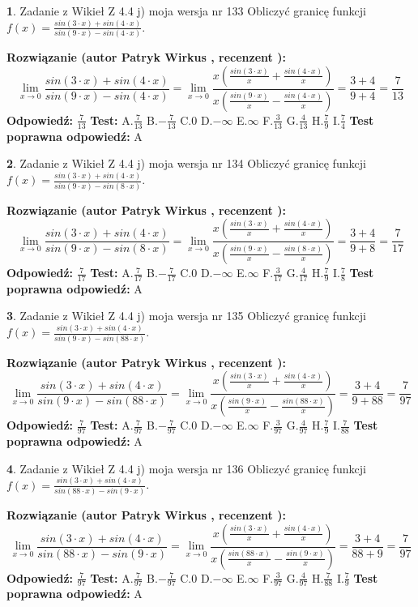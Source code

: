 \documentclass[12pt, a4paper]{article}
\theoremstyle{definition} %
\newtheorem{zad}{}
\newcommand{\zadStart}[1]{\begin{zad}#1\newline}
\newcommand{\zadStop}{\end{zad}}
\newcommand{\rozwStart}[2]{\noindent \textbf{Rozwiązanie (autor #1 , recenzent #2): }\newline}
\newcommand{\rozwStop}{\newline}
\newcommand{\odpStart}{\noindent \textbf{Odpowiedź:}\newline}
\newcommand{\odpStop}{\newline}
\newcommand{\testStart}{\noindent \textbf{Test:}\newline}
\newcommand{\testStop}{\newline}
\newcommand{\kluczStart}{\noindent \textbf{Test poprawna odpowiedź:}\newline}
\newcommand{\kluczStop}{\newline}
\begin{document}
\zadStart{Zadanie z Wikieł Z 4.4 j) moja wersja nr 133}
Obliczyć granicę funkcji $f(x)=\frac{sin(3\cdot x) +sin(4\cdot x)}{sin(9\cdot x) -sin(4\cdot x)}$.
\zadStop
\rozwStart{Patryk Wirkus}{}
$$\lim\limits_{x\to 0}\frac{sin(3\cdot x) +sin(4\cdot x)}{sin(9\cdot x) -sin(4\cdot x)}=\lim\limits_{x\to 0}\frac{x(\frac{sin(3\cdot x)}{x}+\frac{sin(4\cdot x)}{x})}{x(\frac{sin(9\cdot x)}{x}-\frac{sin(4\cdot x)}{x})}=\frac{3+4}{9+4} = \frac{7}{13}$$
\rozwStop
\odpStart
$\frac{7}{13}$
\odpStop
\testStart
A.$\frac{7}{13}$
B.$-\frac{7}{13}$
C.$0$
D.$-\infty$
E.$\infty$
F.$\frac{3}{13}$
G.$\frac{4}{13}$
H.$\frac{7}{9}$
I.$\frac{7}{4}$
\testStop
\kluczStart
A
\kluczStop



\zadStart{Zadanie z Wikieł Z 4.4 j) moja wersja nr 134}
Obliczyć granicę funkcji $f(x)=\frac{sin(3\cdot x) +sin(4\cdot x)}{sin(9\cdot x) -sin(8\cdot x)}$.
\zadStop
\rozwStart{Patryk Wirkus}{}
$$\lim\limits_{x\to 0}\frac{sin(3\cdot x) +sin(4\cdot x)}{sin(9\cdot x) -sin(8\cdot x)}=\lim\limits_{x\to 0}\frac{x(\frac{sin(3\cdot x)}{x}+\frac{sin(4\cdot x)}{x})}{x(\frac{sin(9\cdot x)}{x}-\frac{sin(8\cdot x)}{x})}=\frac{3+4}{9+8} = \frac{7}{17}$$
\rozwStop
\odpStart
$\frac{7}{17}$
\odpStop
\testStart
A.$\frac{7}{17}$
B.$-\frac{7}{17}$
C.$0$
D.$-\infty$
E.$\infty$
F.$\frac{3}{17}$
G.$\frac{4}{17}$
H.$\frac{7}{9}$
I.$\frac{7}{8}$
\testStop
\kluczStart
A
\kluczStop



\zadStart{Zadanie z Wikieł Z 4.4 j) moja wersja nr 135}
Obliczyć granicę funkcji $f(x)=\frac{sin(3\cdot x) +sin(4\cdot x)}{sin(9\cdot x) -sin(88\cdot x)}$.
\zadStop
\rozwStart{Patryk Wirkus}{}
$$\lim\limits_{x\to 0}\frac{sin(3\cdot x) +sin(4\cdot x)}{sin(9\cdot x) -sin(88\cdot x)}=\lim\limits_{x\to 0}\frac{x(\frac{sin(3\cdot x)}{x}+\frac{sin(4\cdot x)}{x})}{x(\frac{sin(9\cdot x)}{x}-\frac{sin(88\cdot x)}{x})}=\frac{3+4}{9+88} = \frac{7}{97}$$
\rozwStop
\odpStart
$\frac{7}{97}$
\odpStop
\testStart
A.$\frac{7}{97}$
B.$-\frac{7}{97}$
C.$0$
D.$-\infty$
E.$\infty$
F.$\frac{3}{97}$
G.$\frac{4}{97}$
H.$\frac{7}{9}$
I.$\frac{7}{88}$
\testStop
\kluczStart
A
\kluczStop



\zadStart{Zadanie z Wikieł Z 4.4 j) moja wersja nr 136}
Obliczyć granicę funkcji $f(x)=\frac{sin(3\cdot x) +sin(4\cdot x)}{sin(88\cdot x) -sin(9\cdot x)}$.
\zadStop
\rozwStart{Patryk Wirkus}{}
$$\lim\limits_{x\to 0}\frac{sin(3\cdot x) +sin(4\cdot x)}{sin(88\cdot x) -sin(9\cdot x)}=\lim\limits_{x\to 0}\frac{x(\frac{sin(3\cdot x)}{x}+\frac{sin(4\cdot x)}{x})}{x(\frac{sin(88\cdot x)}{x}-\frac{sin(9\cdot x)}{x})}=\frac{3+4}{88+9} = \frac{7}{97}$$
\rozwStop
\odpStart
$\frac{7}{97}$
\odpStop
\testStart
A.$\frac{7}{97}$
B.$-\frac{7}{97}$
C.$0$
D.$-\infty$
E.$\infty$
F.$\frac{3}{97}$
G.$\frac{4}{97}$
H.$\frac{7}{88}$
I.$\frac{7}{9}$
\testStop
\kluczStart
A
\kluczStop
\end{document}
